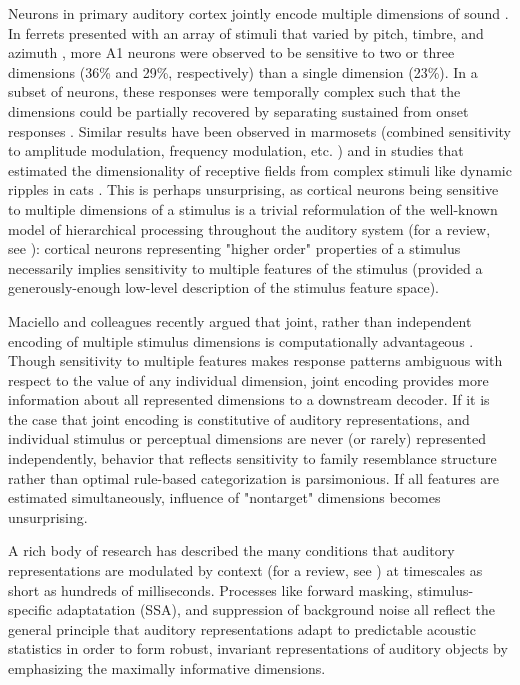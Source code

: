 Neurons in primary auditory cortex jointly encode multiple dimensions of sound \citep{kingRecentAdvancesUnderstanding2018a}. In ferrets presented with an array of stimuli that varied by pitch, timbre, and azimuth \citep{bizleyInterdependentEncodingPitch2009b}, more A1 neurons were observed to be sensitive to two or three dimensions (36\% and 29\%, respectively) than a single dimension (23\%). In a subset of neurons, these responses were temporally complex such that the dimensions could be partially recovered by separating sustained from onset responses \citep{walkerMultiplexedRobustRepresentations2011}. Similar results have been observed in marmosets (combined sensitivity to amplitude modulation, frequency modulation, etc. \citep{Wang2005a}) and in studies that estimated the dimensionality of receptive fields from complex stimuli like dynamic ripples in cats \citep{atencioMultidimensionalReceptiveField2017}. This is perhaps unsurprising, as cortical neurons being sensitive to multiple dimensions of a stimulus is a trivial reformulation of the well-known model of hierarchical processing throughout the auditory system (for a review, see \citep{sharpeeHierarchicalRepresentationsAuditory2011b}): cortical neurons representing "higher order" properties of a stimulus necessarily implies sensitivity to multiple features of the stimulus (provided a generously-enough low-level description of the stimulus feature space).

Maciello and colleagues recently argued that joint, rather than independent encoding of multiple stimulus dimensions is computationally advantageous \citep{macellaioWhySensoryNeurons2020}. Though sensitivity to multiple features makes response patterns ambiguous with respect to the value of any individual dimension, joint encoding provides more information about all represented dimensions to a downstream decoder. If it is the case that joint encoding is constitutive of auditory representations, and individual stimulus or perceptual dimensions are never (or rarely) represented independently, behavior that reflects sensitivity to family resemblance structure rather than optimal rule-based categorization is parsimonious. If all features are estimated simultaneously, influence of "nontarget" dimensions becomes unsurprising. 

A rich body of research has described the many conditions that auditory representations are modulated by context (for a review, see \citep{angeloniContextualModulationSound2018}) at timescales as short as hundreds of milliseconds\citep{deanRapidNeuralAdaptation2008b,rabinowitzContrastGainControl2011c}. Processes like forward masking, stimulus-specific adaptatation (SSA), and suppression of background noise all reflect the general principle that auditory representations adapt to predictable acoustic statistics in order to form robust, invariant representations of auditory objects\citep{rabinowitzConstructingNoiseinvariantRepresentations2013} by emphasizing the maximally informative dimensions\citep{atencioMultidimensionalReceptiveField2017}. 

